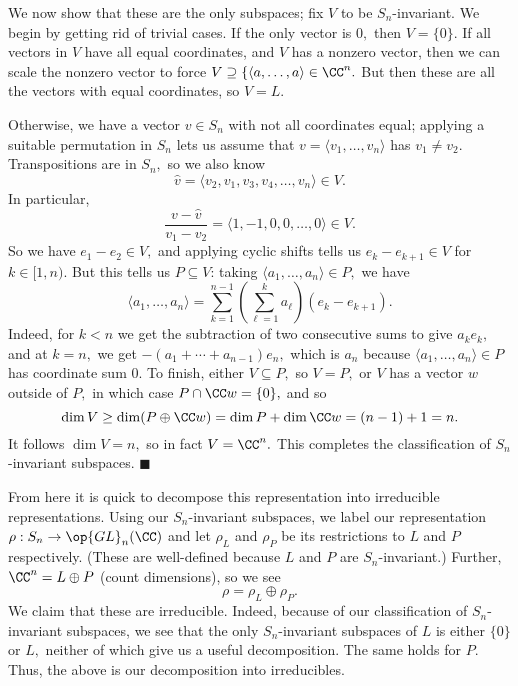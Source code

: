 We now show that these are the only subspaces; fix $V$ to be $S_n$-invariant. We begin by getting rid of trivial cases. If the only vector is $0,$ then $V=\{0\}.$ If all vectors in $V$ have all equal coordinates, and $V$ has a nonzero vector, then we can scale the nonzero vector to force $V\supseteq\{\langle a,\ldots,a\rangle\in\CC^n.$ But then these are all the vectors with equal coordinates, so $V=L.$

Otherwise, we have a vector $v\in S_n$ with not all coordinates equal; applying a suitable permutation in $S_n$ lets us assume that $v=\langle v_1,\ldots,v_n\rangle$ has $v_1\ne v_2.$ Transpositions are in $S_n,$ so we also know
\[\hat v=\langle v_2,v_1,v_3,v_4,\ldots,v_n\rangle\in V.\]
In particular,
\[\frac{v-\hat v}{v_1-v_2}=\langle1,-1,0,0,\ldots,0\rangle\in V.\]
So we have $e_1-e_2\in V,$ and applying cyclic shifts tells us $e_k-e_{k+1}\in V$ for $k\in[1,n).$ But this tells us $P\subseteq V$: taking $\langle a_1,\ldots,a_n\rangle\in P,$ we have
\[\langle a_1,\ldots,a_n\rangle=\sum_{k=1}^{n-1}\left(\sum_{\ell=1}^ka_\ell\right)(e_k-e_{k+1}).\]
Indeed, for $k<n$ we get the subtraction of two consecutive sums to give $a_ke_k,$ and at $k=n,$ we get $-(a_1+\cdots+a_{n-1})e_n,$ which is $a_n$ because $\langle a_1,\ldots,a_n\rangle\in P$ has coordinate sum $0.$ To finish, either $V\subseteq P,$ so $V=P,$ or $V$ has a vector $w$ outside of $P,$ in which case $P\cap\CC w=\{0\},$ and so
\[\dim V\ge\dim(P\oplus\CC w)=\dim P+\dim\CC w=(n-1)+1=n.\]
It follows $\dim V=n,$ so in fact $V=\CC^n.$ This completes the classification of $S_n$-invariant subspaces. $\blacksquare$

From here it is quick to decompose this representation into irreducible representations. Using our $S_n$-invariant subspaces, we label our representation $\rho:S_n\to\op{GL}_n(\CC)$ and let $\rho_L$ and $\rho_P$ be its restrictions to $L$ and $P$ respectively. (These are well-defined because $L$ and $P$ are $S_n$-invariant.) Further, $\CC^n=L\oplus P$ (count dimensions), so we see
\[\rho=\rho_L\oplus\rho_P.\]
We claim that these are irreducible. Indeed, because of our classification of $S_n$-invariant subspaces, we see that the only $S_n$-invariant subspaces of $L$ is either $\{0\}$ or $L,$ neither of which give us a useful decomposition. The same holds for $P.$ Thus, the above is our decomposition into irreducibles.

